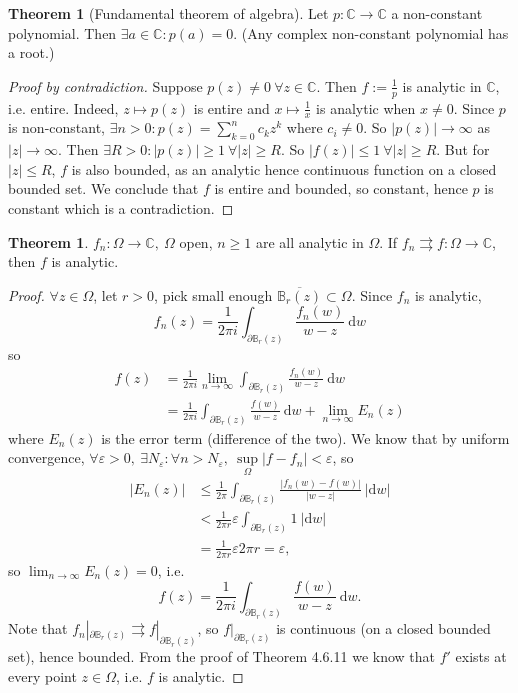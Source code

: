 \documentclass[a4paper]{article}
\theoremstyle{definition}
\newtheorem{thm}[defn]{Theorem}
\begin{document}
\begin{thm}[Fundamental theorem of algebra]
Let $p:\mathbb C\rightarrow \mathbb C$ a non-constant polynomial. Then $\exists a \in \mathbb C:p(a)=0$.
(Any complex non-constant polynomial has a root.)
\end{thm}
\begin{proof}[Proof by contradiction]
Suppose $p(z)\neq 0 \ \forall z\in \mathbb C$. Then $f:=\frac{1}{p}$ is analytic in $\mathbb C$, i.e. entire. Indeed, $z\mapsto p(z)$ is entire and $x\mapsto \frac{1}{x}$ is analytic when $x\neq 0$. Since $p$ is non-constant, $\exists n>0:p(z) =\sum_{k=0}^n c_k z^k$ where $c_i\neq 0$. So $|p(z)| \rightarrow \infty$ as $|z|\rightarrow \infty$. Then $\exists R>0:|p(z)|\geq 1 \ \forall |z| \geq R$. So $|f(z)| \leq 1 \ \forall |z| \geq R$. But for $|z| \leq R$, $f$ is also bounded, as an analytic hence continuous function on a closed bounded set. We conclude that $f$ is entire and bounded, so constant, hence $p$ is constant which is a contradiction.
\end{proof}
\begin{thm}
$f_n:\Omega \rightarrow \mathbb C,\ \Omega$ open, $n\geq 1$ are all analytic in $\Omega$. If $f_n \rightrightarrows f:\Omega \rightarrow \mathbb C$, then $f$ is analytic.
\end{thm}
\begin{proof}
$\forall z\in \Omega$, let $r>0$, pick small enough $\overline{\mathbb B_r(z)} \subset \Omega$. Since $f_n$ is analytic,
\[
f_n(z) = \frac{1}{2\pi i} \int_{\partial \mathbb B_r(z)} \frac{f_n(w)}{w-z} \ \mathrm d w
\]
so
\[
\begin{aligned}
f(z) &= \frac{1}{2\pi i} \lim_{n\rightarrow \infty} \int_{\partial \mathbb B_r(z)} \frac{f_n(w)}{w-z} \ \mathrm d w \\
&=\frac{1}{2\pi i} \int_{\partial \mathbb B_r(z)} \frac{f(w)}{w-z} \ \mathrm d w + \lim_{n\rightarrow \infty} E_n(z)
\end{aligned}
\]
where $E_n(z)$ is the error term (difference of the two). We know that by uniform convergence, $\forall \varepsilon >0,\ \exists N_\varepsilon: \forall n>N_\varepsilon,\ \underset{\Omega}{\sup} |f-f_n| <\varepsilon$, so
\[
\begin{aligned}
|E_n(z)| &\leq \frac{1}{2\pi} \int_{\partial \mathbb B_r(z)} \frac{|f_n(w)-f(w)|}{|w-z|} \ |\mathrm d w| \\
&< \frac{1}{2\pi r} \varepsilon \int_{\partial \mathbb B_r(z)} 1 \ |\mathrm d w| \\
&= \frac{1}{2\pi r} \varepsilon 2\pi r = \varepsilon,
\end{aligned}
\]
so $\lim_{n\rightarrow \infty} E_n(z)=0$, i.e.
\[
f(z)=\frac{1}{2\pi i} \int_{\partial \mathbb B_r(z)} \frac{f(w)}{w-z} \ \mathrm d w.
\]
Note that $f_n|_{\partial \mathbb B_r(z)} \rightrightarrows f|_{\partial \mathbb B_r(z)}$, so $f|_{\partial \mathbb B_r(z)}$ is continuous (on a closed bounded set), hence bounded. From the proof of Theorem 4.6.11 we know that $f'$ exists at every point $z\in \Omega$, i.e. $f$ is analytic.
\end{proof}
\end{document}
